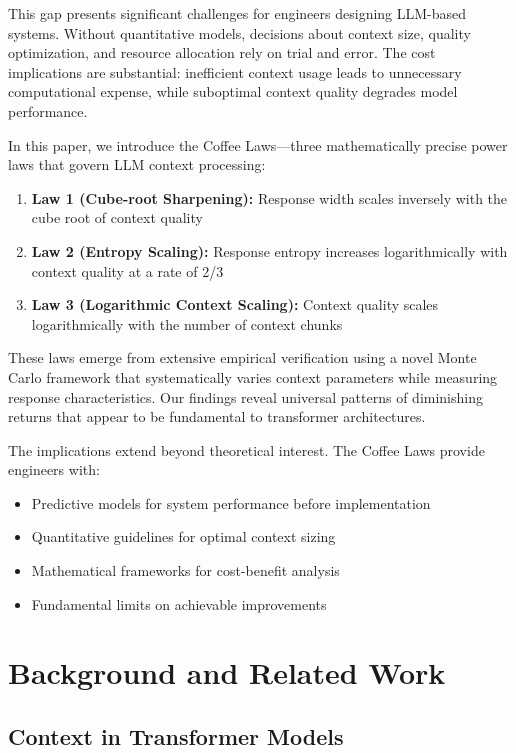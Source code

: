 \documentclass[conference]{IEEEtran}
\begin{document}
This gap presents significant challenges for engineers designing LLM-based systems. Without quantitative models, decisions about context size, quality optimization, and resource allocation rely on trial and error. The cost implications are substantial: inefficient context usage leads to unnecessary computational expense, while suboptimal context quality degrades model performance.

In this paper, we introduce the Coffee Laws—three mathematically precise power laws that govern LLM context processing:

\begin{enumerate}
\item \textbf{Law 1 (Cube-root Sharpening):} Response width scales inversely with the cube root of context quality
\item \textbf{Law 2 (Entropy Scaling):} Response entropy increases logarithmically with context quality at a rate of 2/3
\item \textbf{Law 3 (Logarithmic Context Scaling):} Context quality scales logarithmically with the number of context chunks
\end{enumerate}

These laws emerge from extensive empirical verification using a novel Monte Carlo framework that systematically varies context parameters while measuring response characteristics. Our findings reveal universal patterns of diminishing returns that appear to be fundamental to transformer architectures.

The implications extend beyond theoretical interest. The Coffee Laws provide engineers with:
\begin{itemize}
\item Predictive models for system performance before implementation
\item Quantitative guidelines for optimal context sizing
\item Mathematical frameworks for cost-benefit analysis
\item Fundamental limits on achievable improvements
\end{itemize}

\section{Background and Related Work}

\subsection{Context in Transformer Models}
\end{document}
